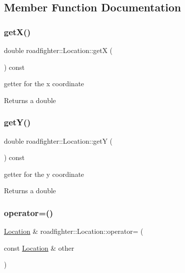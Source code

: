 \subsection{Member Function Documentation}
\mbox{\label{classroadfighter_1_1Location_aa06be0d4efd3bcf984c65d85506057fd}} 
\subsubsection{\texorpdfstring{get\+X()}{getX()}}
{\footnotesize\ttfamily double roadfighter\+::\+Location\+::getX (\begin{DoxyParamCaption}{ }\end{DoxyParamCaption}) const}

getter for the x coordinate \begin{DoxyReturn}{Returns}
a double 
\end{DoxyReturn}
\mbox{\label{classroadfighter_1_1Location_ae249866ad25f0127591f1abd478a17cd}} 
\subsubsection{\texorpdfstring{get\+Y()}{getY()}}
{\footnotesize\ttfamily double roadfighter\+::\+Location\+::getY (\begin{DoxyParamCaption}{ }\end{DoxyParamCaption}) const}

getter for the y coordinate \begin{DoxyReturn}{Returns}
a double 
\end{DoxyReturn}
\mbox{\label{classroadfighter_1_1Location_a44b584ce6b39f638d08709ae370feaf4}} 
\subsubsection{\texorpdfstring{operator=()}{operator=()}\hspace{0.1cm}{\footnotesize\ttfamily [1/2]}}
{\footnotesize\ttfamily \hyperlink{classroadfighter_1_1Location}{Location} \& roadfighter\+::\+Location\+::operator= (\begin{DoxyParamCaption}\item[{const \hyperlink{classroadfighter_1_1Location}{Location} \&}]{other }\end{DoxyParamCaption})}


